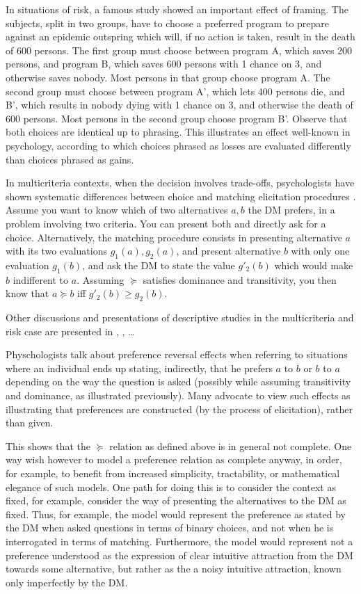 \documentclass[french, english]{llncs}
\begin{document}
	In situations of risk, a famous study \citep{tversky_1981} showed an important effect of framing. The subjects, split in two groups, have to choose a preferred program to prepare against an epidemic outspring which will, if no action is taken, result in the death of 600 persons. The first group must choose between program A, which saves 200 persons, and program B, which saves 600 persons with 1 chance on 3, and otherwise saves nobody. Most persons in that group choose program A. The second group must choose between program A', which lets 400 persons die, and B', which results in nobody dying with 1 chance on 3, and otherwise the death of 600 persons. Most persons in the second group choose program B'. Observe that both choices are identical up to phrasing. This illustrates an effect well-known in psychology, according to which choices phrased as losses are evaluated differently than choices phrased as gains.
	
	In multicriteria contexts, when the decision involves trade-offs, psychologists have shown systematic differences between choice and matching elicitation procedures \citep{tversky_contingent_1988}. Assume you want to know which of two alternatives $a, b$ the \ac{DM} prefers, in a problem involving two criteria. You can present both and directly ask for a choice. Alternatively, the matching procedure consists in presenting alternative $a$ with its two evaluations $g_1(a), g_2(a)$, and present alternative $b$ with only one evaluation $g_1(b)$, and ask the \ac{DM} to state the value $g'_2(b)$ which would make $b$ indifferent to $a$. Assuming $\succeq$ satisfies dominance and transitivity, you then know that $a \succeq b$ iff $g'_2(b) ≥ g_2(b)$.
	
	Other discussions and presentations of descriptive studies in the multicriteria and risk case are presented in \citet[Ch. 2]{deparis_2012}, \citet{slovic_construction_2006, Camerer and Ho (1994)}, …
	
	Physchologists talk about preference reversal effects when referring to situations where an individual ends up stating, indirectly, that he prefers $a$ to $b$ or $b$ to $a$ depending on the way the question is asked (possibly while assuming transitivity and dominance, as illustrated previously). Many advocate to view such effects as illustrating that preferences are constructed (by the process of elicitation), rather than given.
	
	This shows that the $\succeq$ relation as defined above is in general not complete. One way wish however to model a preference relation as complete anyway, in order, for example, to benefit from increased simplicity, tractability, or mathematical elegance of such models. One path for doing this is to consider the context as fixed, for example, consider the way of presenting the alternatives to the \ac{DM} as fixed. Thus, for example, the model would represent the preference as stated by the \ac{DM} when asked questions in terms of binary choices, and not when he is interrogated in terms of matching. Furthermore, the model would represent not a preference understood as the expression of clear intuitive attraction from the \ac{DM} towards some alternative, but rather as the a noisy intuitive attraction, known only imperfectly by the \ac{DM}. 
	
\end{document}
